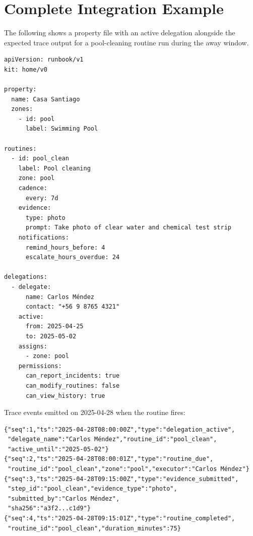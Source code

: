 \section{Complete Integration Example}
\label{sec:integration-complete-example}

The following shows a property file with an active delegation alongside the expected trace
output for a pool-cleaning routine run during the away window.

\begin{verbatim}
apiVersion: runbook/v1
kit: home/v0

property:
  name: Casa Santiago
  zones:
    - id: pool
      label: Swimming Pool

routines:
  - id: pool_clean
    label: Pool cleaning
    zone: pool
    cadence:
      every: 7d
    evidence:
      type: photo
      prompt: Take photo of clear water and chemical test strip
    notifications:
      remind_hours_before: 4
      escalate_hours_overdue: 24

delegations:
  - delegate:
      name: Carlos Méndez
      contact: "+56 9 8765 4321"
    active:
      from: 2025-04-25
      to: 2025-05-02
    assigns:
      - zone: pool
    permissions:
      can_report_incidents: true
      can_modify_routines: false
      can_view_history: true
\end{verbatim}

Trace events emitted on 2025-04-28 when the routine fires:

\begin{verbatim}
{"seq":1,"ts":"2025-04-28T08:00:00Z","type":"delegation_active",
 "delegate_name":"Carlos Méndez","routine_id":"pool_clean",
 "active_until":"2025-05-02"}
{"seq":2,"ts":"2025-04-28T08:00:01Z","type":"routine_due",
 "routine_id":"pool_clean","zone":"pool","executor":"Carlos Méndez"}
{"seq":3,"ts":"2025-04-28T09:15:00Z","type":"evidence_submitted",
 "step_id":"pool_clean","evidence_type":"photo",
 "submitted_by":"Carlos Méndez",
 "sha256":"a3f2...c1d9"}
{"seq":4,"ts":"2025-04-28T09:15:01Z","type":"routine_completed",
 "routine_id":"pool_clean","duration_minutes":75}
\end{verbatim}
